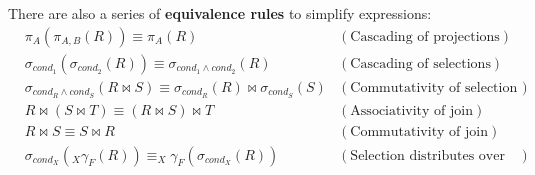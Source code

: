 There are also a series of \textbf{equivalence rules} to simplify expressions:
\begin{align*}
    &\pi_A(\pi_{A,B}(R)) \equiv \pi_A(R) &(\text{Cascading of projections})\\
    &\sigma_{\textit{cond}_1}(\sigma_{\textit{cond}_2}(R)) \equiv \sigma_{\textit{cond}_1 \land \textit{cond}_2}(R) &(\text{Cascading of selections})\\
    &\sigma_{\textit{cond}_R \land \textit{cond}_S}(R \bowtie S) \equiv \sigma_{\textit{cond}_R}(R) \bowtie \sigma_{\textit{cond}_S}(S) &(\text{Commutativity of selection and join})\\
    &R \bowtie (S \bowtie T) \equiv (R \bowtie S) \bowtie T &(\text{Associativity of join})\\
    &R \bowtie S \equiv S \bowtie R &(\text{Commutativity of join})\\
    &\sigma_{\textit{cond}_X}(_X \gamma_{F}(R)) \equiv _X \gamma_{F}(\sigma_{\textit{cond}_X}(R)) &(\text{Selection distributes over grouping})
\end{align*}